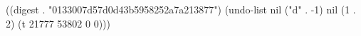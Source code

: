 
((digest . "0133007d57d0d43b5958252a7a213877") (undo-list nil ("d" . -1) nil (1 . 2) (t 21777 53802 0 0)))
